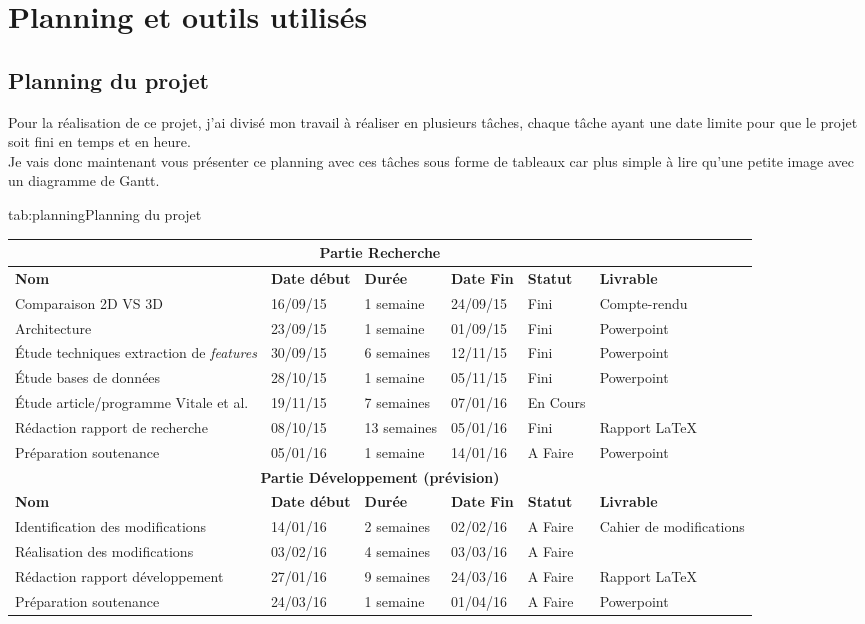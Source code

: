 \documentclass[overfullbox, poster]{polytech/polytech}
\begin{document}
\chapter{Planning et outils utilisés}
\label{chap:chap_planning}

\section{Planning du projet}
Pour la réalisation de ce projet, j'ai divisé mon travail à réaliser en plusieurs tâches, chaque tâche ayant une date limite pour que le projet soit fini en temps et en heure.\\
Je vais donc maintenant vous présenter ce planning avec ces tâches sous forme de tableaux car plus simple à lire qu'une petite image avec un diagramme de Gantt.

\begin{Table}{tab:planning}{Planning du projet}
	\begin{tabular}{|p{4cm}|p{2cm}|p{2cm}|p{2cm}|p{1cm}|p{2cm}|}
		\hline
		\multicolumn{6}{|c|}{\textbf{Partie Recherche}}\\\hline
		\textbf{Nom} &\textbf{Date début} &\textbf{Durée} &\textbf{Date Fin} &\textbf{Statut} &\textbf{Livrable}\\\hline
		Comparaison 2D VS 3D &16/09/15 &1 semaine &24/09/15 &Fini & Compte-rendu\\\hline
		Architecture &23/09/15 &1 semaine &01/09/15 &Fini  & Powerpoint\\\hline
		Étude techniques extraction de \textit{features} &30/09/15 &6 semaines &12/11/15 &Fini & Powerpoint\\\hline
		Étude bases de données &28/10/15 &1 semaine &05/11/15 &Fini & Powerpoint\\\hline
		Étude article/programme Vitale et al. &19/11/15 &7 semaines &07/01/16 &En Cours & \\\hline
		Rédaction rapport de recherche &08/10/15 &13 semaines &05/01/16 &Fini & Rapport \LaTeX\\\hline
		Préparation soutenance &05/01/16 &1 semaine &14/01/16 &A Faire & Powerpoint\\\hline
		\hline
		\multicolumn{6}{|c|}{\textbf{Partie Développement (prévision)}}\\\hline
		\textbf{Nom} &\textbf{Date début} &\textbf{Durée} &\textbf{Date Fin} &\textbf{Statut} &\textbf{Livrable}\\\hline
		Identification des modifications &14/01/16 &2 semaines &02/02/16 &A Faire & Cahier de modifications\\\hline
		Réalisation des modifications &03/02/16 &4 semaines &03/03/16 &A Faire & \\\hline
		Rédaction rapport développement &27/01/16 &9 semaines &24/03/16 &A Faire & Rapport \LaTeX\\\hline
		Préparation soutenance &24/03/16 &1 semaine &01/04/16 &A Faire & Powerpoint\\\hline
	\end{tabular}
\end{Table}
\end{document}

